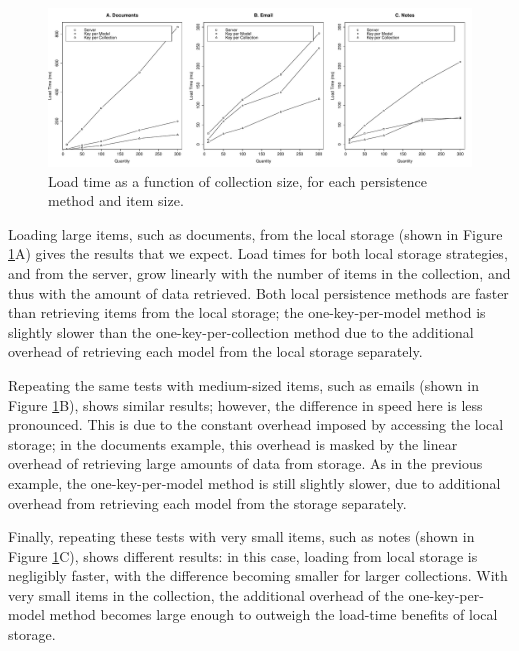 \documentclass[12pt]{article}
\begin{document}
\begin{figure}[th]
  \centering
  \includegraphics[width=\textwidth]{lines.pdf}
  \caption{Load time as a function of collection size, for each persistence
  method and item size.}
  \label{fig:line}
\end{figure}

Loading large items, such as documents, from the local storage (shown in Figure
\ref{fig:line}A) gives the results that we expect. Load times for both
local storage strategies, and from the server, grow linearly with the number of
items in the collection, and thus with the amount of data retrieved. Both local
persistence methods are faster than retrieving items from the local storage;
the one-key-per-model method is slightly slower than the one-key-per-collection
method due to the additional overhead of retrieving each model from the local
storage separately.

Repeating the same tests with medium-sized items, such as emails (shown in
Figure \ref{fig:line}B), shows similar results; however, the difference in
speed here is less pronounced. This is due to the constant overhead imposed by
accessing the local storage; in the documents example, this overhead is masked
by the linear overhead of retrieving large amounts of data from storage. As in
the previous example, the one-key-per-model method is still slightly slower,
due to additional overhead from retrieving each model from the storage
separately.

Finally, repeating these tests with very small items, such as notes (shown in
Figure \ref{fig:line}C), shows different results: in this case, loading from
local storage is negligibly faster, with the difference becoming smaller for
larger collections. With very small items in the collection, the additional
overhead of the one-key-per-model method becomes large enough to outweigh the
load-time benefits of local storage.
\end{document}
